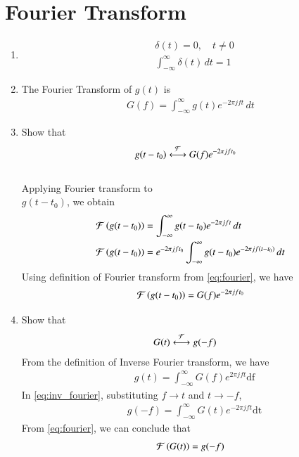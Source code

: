\documentclass[journal,12pt,twocolumn]{IEEEtran}
\renewcommand\thesection{\arabic{section}}
\begin{document}
\section{Fourier Transform}
\begin{enumerate}[label=\thesection.\arabic*
,ref=\thesection.\theenumi]

\item 
\begin{align}
&\delta(t)=0, \quad t\neq0
\\
&\int_{-\infty}^{\infty}\delta(t) \, dt= 1
\label{eq:delta}
\end{align}
\item The Fourier Transform of $g(t)$ is
\begin{align}
G(f)=\int_{-\infty}^{\infty}g(t)e^{-2\pi jft}\,dt
\label{eq:fourier}
\end{align}


\item Show that 
\begin{align}
g(t-t_0)&\overset{\mathcal{F}}{ \longleftrightarrow}G(f)e^{-2\pi jft_0}
\end{align}\\
\solution
Applying Fourier transform to \\ $g(t - t_0)$, we obtain
\begin{align}
	&\mathcal{F}\left(g(t - t_0)\right) = \int_{-\infty}^{\infty}g(t - t_0)e^{-2\pi jft}\,dt \\
	&\mathcal{F}\left(g(t - t_0)\right) = e^{-2 \pi jf t_0} \int_{-\infty}^{\infty}g(t - t_0)e^{-2\pi jf\left(t - t_0\right)} \,dt 
\end{align}
Using definition of Fourier transform from \eqref{eq:fourier}, we have 
\begin{align}
	\mathcal{F}\left(g(t - t_0)\right) = G(f)e^{-2\pi jft_0}
\end{align}


\item Show that 
\begin{align}
 G(t)&\overset{\mathcal{F}}{ \longleftrightarrow}g(-f)
\end{align}
\solution
From the definition of Inverse Fourier transform, we have 
\begin{align} 
	&g(t) = \int_{-\infty}^{\infty} G(f) e^{2 \pi jft} \text{df}
	\label{eq:inv_fourier}
\end{align}
In \eqref{eq:inv_fourier}, substituting $f \rightarrow t$ and $t \rightarrow -f$,
\begin{align}
	&g(-f) = \int_{-\infty}^{\infty} G(t) e^{-2 \pi jft} \text{dt}
\end{align}
From \eqref{eq:fourier}, we can conclude that 
\begin{equation}
	\mathcal{F}\left(G(t)\right) = g(-f)
\end{equation}



\end{enumerate}
\end{document}

